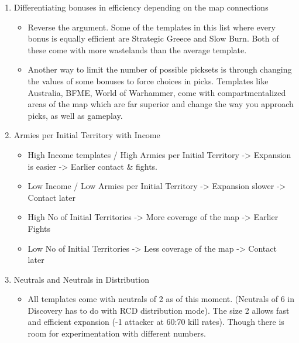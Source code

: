 \begin{itemize}
\begin{enumerate}
\begin{itemize}
            \item Regardless, you can see a sweet spot at 20-35 \% ratio. Higher, is often accompanied with low size of wastelands (Guiroma, Basileia, Laketown, Hannibal at the Gates, Numenor) or in the case of Strategic Greece, a very brawly game. Lower than that is only observed in GME III, Tarabonia's Choice and Unicorn Island, with all 3 having a very distinct playstyle of trying your best to flank your opponent at the other side of the board. 
        \end{itemize}
        \item Differentiating bonuses in efficiency depending on the map connections
        \begin{itemize}
            \item Reverse the argument. Some of the templates in this list where every bonus is equally efficient are Strategic Greece and Slow Burn. Both of these come with more wastelands than the average template.
            \item Another way to limit the number of possible picksets is through changing the values of some bonuses to force choices in picks. Templates like Australia, BFME, World of Warhammer, come with compartmentalized areas of the map which are far superior and change the way you approach picks, as well as gameplay.
        \end{itemize}
        \item Armies per Initial Territory with Income
        \begin{itemize}
            \item High Income templates / High Armies per Initial Territory  -> Expansion is easier -> Earlier contact \& fights. 
            \item Low Income / Low Armies per Initial Territory  -> Expansion slower -> Contact later
            \item High No of Initial Territories -> More coverage of the map -> Earlier Fights
            \item Low No of Initial Territories -> Less coverage of the map -> Contact later
        \end{itemize}
        \item Neutrals and Neutrals in Distribution
        \begin{itemize}
            \item All templates come with neutrals of 2 as of this moment. (Neutrals of 6 in Discovery has to do with RCD distribution mode). The size 2 allows fast and efficient expansion (-1 attacker at 60:70 kill rates). Though there is room for experimentation with different numbers.

\end{itemize}
\end{enumerate}
\end{itemize}
